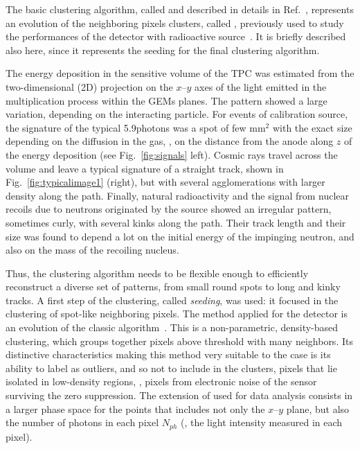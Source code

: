 The basic clustering algorithm, called \idbscan and  described in 
details in Ref.~\cite{iDBSCAN}, represents an evolution of the
neighboring pixels clusters, called \nnc, previously used to study the
performances of the \lemon detector with \fe radioactive
source~\cite{bib:fe55}. It is briefly described also here, since it
represents the seeding for the final clustering algorithm.

The energy deposition in the sensitive volume of the TPC was estimated
from the two-dimensional (2D) projection on the $x$--$y$ axes of the
light emitted in the multiplication process within the GEMs
planes. The pattern showed a large variation, depending on the interacting
particle. For events of \fe calibration source, the signature of the
typical 5.9\keV photons was a spot of few mm$^2$ with the exact size
depending on the diffusion in the gas, \ie, on the distance from the
anode along $z$ of the energy deposition (see Fig.~\ref{fig:signals}
left). Cosmic rays travel across the volume and leave a typical
signature of a straight track, shown in Fig.~\ref{fig:typicalimage1}
(right), but with several agglomerations with larger density along the
path. Finally, natural radioactivity and the signal from nuclear
recoils due to neutrons originated by the \ambe source showed an
irregular pattern, sometimes curly, with several kinks along the
path. Their track length and their size was found to depend  a lot on the initial
energy of the impinging neutron, and also on the mass of the recoiling
nucleus.

Thus, the clustering algorithm needs to be flexible enough to
efficiently reconstruct a diverse set of patterns, from small round
spots to long and kinky tracks. A first step of the clustering,
called \textit{seeding}, was used: it focused in the clustering of spot-like
neighboring pixels.  The method applied for the \lemon detector is an
evolution of the classic \dbscan algorithm~\cite{dbscan}.  This is a
non-parametric, density-based clustering, which groups together pixels
above threshold with many neighbors. Its distinctive characteristics
making this method very suitable to the \lemon case is its ability to
label as outliers, and so not to include in the clusters, pixels that
lie isolated in low-density regions, \ie, pixels from electronic noise
of the sensor surviving the zero suppression. The extension of \dbscan
used for \lemon data analysis consists in a larger phase space for the
points that includes not only the $x$--$y$ plane, but also the number
of photons in each pixel $N_{ph}$ (\ie, the light intensity measured in
each pixel).

